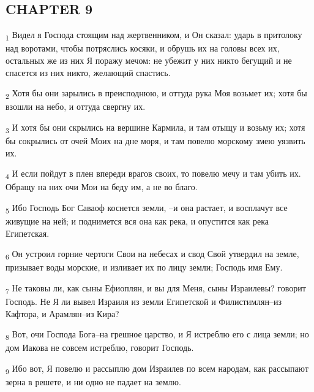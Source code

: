 \subsection{CHAPTER 9}
\begin{tcolorbox}
\textsubscript{1} Видел я Господа стоящим над жертвенником, и Он сказал: ударь в притолоку над воротами, чтобы потряслись косяки, и обрушь их на головы всех их, остальных же из них Я поражу мечом: не убежит у них никто бегущий и не спасется из них никто, желающий спастись.
\end{tcolorbox}
\begin{tcolorbox}
\textsubscript{2} Хотя бы они зарылись в преисподнюю, и оттуда рука Моя возьмет их; хотя бы взошли на небо, и оттуда свергну их.
\end{tcolorbox}
\begin{tcolorbox}
\textsubscript{3} И хотя бы они скрылись на вершине Кармила, и там отыщу и возьму их; хотя бы сокрылись от очей Моих на дне моря, и там повелю морскому змею уязвить их.
\end{tcolorbox}
\begin{tcolorbox}
\textsubscript{4} И если пойдут в плен впереди врагов своих, то повелю мечу и там убить их. Обращу на них очи Мои на беду им, а не во благо.
\end{tcolorbox}
\begin{tcolorbox}
\textsubscript{5} Ибо Господь Бог Саваоф коснется земли, --и она растает, и восплачут все живущие на ней; и поднимется вся она как река, и опустится как река Египетская.
\end{tcolorbox}
\begin{tcolorbox}
\textsubscript{6} Он устроил горние чертоги Свои на небесах и свод Свой утвердил на земле, призывает воды морские, и изливает их по лицу земли; Господь имя Ему.
\end{tcolorbox}
\begin{tcolorbox}
\textsubscript{7} Не таковы ли, как сыны Ефиоплян, и вы для Меня, сыны Израилевы? говорит Господь. Не Я ли вывел Израиля из земли Египетской и Филистимлян--из Кафтора, и Арамлян--из Кира?
\end{tcolorbox}
\begin{tcolorbox}
\textsubscript{8} Вот, очи Господа Бога--на грешное царство, и Я истреблю его с лица земли; но дом Иакова не совсем истреблю, говорит Господь.
\end{tcolorbox}
\begin{tcolorbox}
\textsubscript{9} Ибо вот, Я повелю и рассыплю дом Израилев по всем народам, как рассыпают зерна в решете, и ни одно не падает на землю.
\end{tcolorbox}
